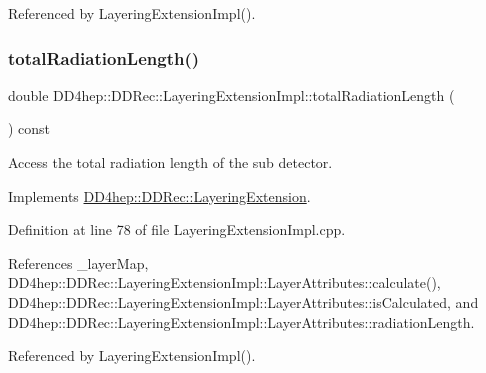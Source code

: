 Referenced by Layering\+Extension\+Impl().

\hypertarget{class_d_d4hep_1_1_d_d_rec_1_1_layering_extension_impl_a69e58dff3608dc58cab88f9542b9317e}{}\label{class_d_d4hep_1_1_d_d_rec_1_1_layering_extension_impl_a69e58dff3608dc58cab88f9542b9317e} 
\subsubsection{\texorpdfstring{total\+Radiation\+Length()}{totalRadiationLength()}}
{\footnotesize\ttfamily double D\+D4hep\+::\+D\+D\+Rec\+::\+Layering\+Extension\+Impl\+::total\+Radiation\+Length (\begin{DoxyParamCaption}{ }\end{DoxyParamCaption}) const\hspace{0.3cm}{\ttfamily [virtual]}}



Access the total radiation length of the sub detector. 



Implements \hyperlink{class_d_d4hep_1_1_d_d_rec_1_1_layering_extension_a710dca345926458ed3ab3abc06490ee9}{D\+D4hep\+::\+D\+D\+Rec\+::\+Layering\+Extension}.



Definition at line 78 of file Layering\+Extension\+Impl.\+cpp.



References \+\_\+layer\+Map, D\+D4hep\+::\+D\+D\+Rec\+::\+Layering\+Extension\+Impl\+::\+Layer\+Attributes\+::calculate(), D\+D4hep\+::\+D\+D\+Rec\+::\+Layering\+Extension\+Impl\+::\+Layer\+Attributes\+::is\+Calculated, and D\+D4hep\+::\+D\+D\+Rec\+::\+Layering\+Extension\+Impl\+::\+Layer\+Attributes\+::radiation\+Length.



Referenced by Layering\+Extension\+Impl().

\hypertarget{class_d_d4hep_1_1_d_d_rec_1_1_layering_extension_impl_a8981b8aa172e91e8a3f1fa490030a06c}{}\label{class_d_d4hep_1_1_d_d_rec_1_1_layering_extension_impl_a8981b8aa172e91e8a3f1fa490030a06c} 
